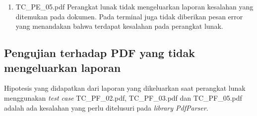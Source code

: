 \begin{enumerate}
\begin{lstlisting}[caption={Perintah yang digunakan untuk menjalankan perangkat lunak}	\label{lst:command},language=php,xleftmargin=.0\textwidth]
Fatal error: Uncaught Exception: Object list not found. Possible secured file. in D:\Skripsi\src\vendor\smalot\pdfparser\src\Smalot\PdfParser\Parser.php:105
Stack trace:
#0 D:\Skripsi\src\vendor\smalot\pdfparser\src\Smalot\PdfParser\Parser.php(81): Smalot\PdfParser\Parser->parseContent('%PDF-1.5\n%\xD0\xD4\xC5\xD8\n...')
#1 D:\Skripsi\src\pdf_checker\SkripsiExtract.php(26): Smalot\PdfParser\Parser->parseFile('D:\\Skripsi\\src\\...')
#2 D:\Skripsi\src\pdf_checker\Main.php(9): SkripsiExtract->extractFromPDF('../res/TC_PE_04...')
#3 {main}
  thrown in D:\Skripsi\src\vendor\smalot\pdfparser\src\Smalot\PdfParser\Parser.php on line 105
\end{lstlisting}

	Pada \textit{test case} ini, perangkat lunak mendeteksi bahwa file ini merupakan file yang \textit{secured}. Hal ini sama dengan yang terjadi pada \textit{test case} TC\_PE\_01.pdf.
	
	\item TC\_PE\_05.pdf \newline
	Perangkat lunak tidak mengeluarkan laporan kesalahan yang ditemukan pada dokumen. Pada terminal juga tidak diberikan pesan error yang menandakan bahwa terdapat kesalahan pada perangkat lunak.
	
\end{enumerate}

\subsection{Pengujian terhadap PDF yang tidak mengeluarkan laporan}
Hipotesis yang didapatkan dari laporan yang dikeluarkan saat perangkat lunak menggunakan \textit{test case} TC\_PF\_02.pdf, TC\_PF\_03.pdf dan TC\_PF\_05.pdf adalah ada kesalahan yang perlu ditelusuri pada \textit{library PdfParser}.

